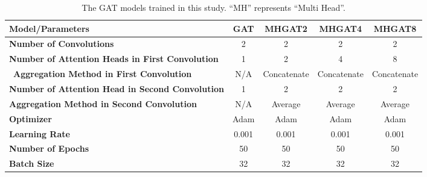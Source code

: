 \begin{table*}[htb!]
    \centering
    \begin{tabular}{|l c c c c|}
        \hline
        \textbf{Model/Parameters} & \textbf{GAT} & \textbf{MHGAT2} & \textbf{MHGAT4} & \textbf{MHGAT8}\\
        \hline
        \textbf{Number of Convolutions} & 2 & 2 & 2 & 2\\
        \textbf{Number of Attention Heads in First Convolution} & 1 & 2 & 4 & 8\\\
        \textbf{Aggregation Method in First Convolution} & N/A & Concatenate & Concatenate & Concatenate\\
        \textbf{Number of Attention Head in Second Convolution} & 1 & 2 & 2 & 2\\
        \textbf{Aggregation Method in Second Convolution} & N/A & Average & Average & Average\\
        \textbf{Optimizer} & Adam & Adam & Adam & Adam\\
        \textbf{Learning Rate} & 0.001 & 0.001 & 0.001 & 0.001\\
        \textbf{Number of Epochs} & 50 & 50 & 50 & 50\\
        \textbf{Batch Size} & 32 & 32 & 32 & 32\\
        \hline
    \end{tabular}
    \caption{The GAT models trained in this study. “MH” represents “Multi Head”.}
    \label{tab:gat-models}
\end{table*}
